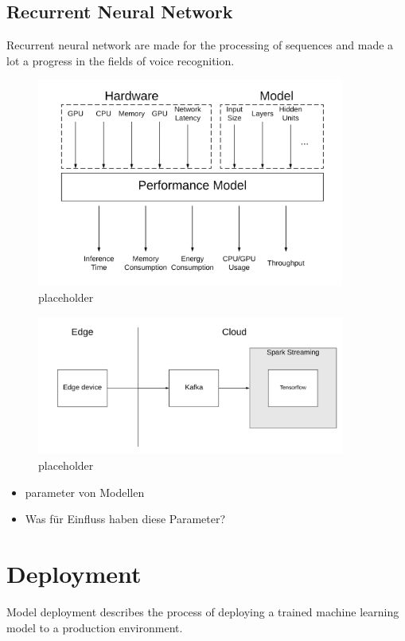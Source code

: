 \subsection{Recurrent Neural Network}
Recurrent neural network are made for the processing of sequences and made a lot a progress in the fields of voice recognition.
\begin{figure}[H]
\centering
\includegraphics[width=0.9\textwidth]{./Bilder/trade_offs.png}
\caption{placeholder}
\label{fig:trade_offs}
\end{figure}
\begin{figure}[H]
\centering
\includegraphics[width=0.9\textwidth]{./Bilder/spark_stream.png}
\caption{placeholder}
\label{fig:trade}
\end{figure}
\begin{itemize}
    \item parameter von Modellen
    \item Was für Einfluss haben diese Parameter?
\end{itemize}
\section{Deployment}
Model deployment describes the process of deploying a trained machine learning model to a production environment.
